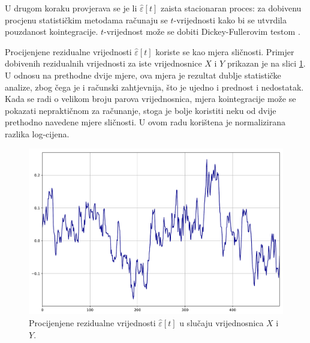 \documentclass[lmodern, utf8, diplomski, numeric]{fer}
\newcommand{\q}{\left}
\newcommand{\w}{\right}
\begin{document}
  U drugom koraku provjerava se je li $\hat{\varepsilon}\q[t\w]$ zaista stacionaran proces: za dobivenu procjenu statističkim metodama računaju se $t$-vrijednosti kako bi se utvrdila pouzdanost kointegracije.
  $t$-vrijednost može se dobiti Dickey-Fullerovim testom \citep{dickey-fuller}.
  
  Procijenjene rezidualne vrijednosti $\hat{\varepsilon}\q[t\w]$ koriste se kao mjera sličnosti.
  Primjer dobivenih rezidualnih vrijednosti za iste vrijednosnice $X$ i $Y$ prikazan je na slici \ref{fig:residual}.
  U odnosu na prethodne dvije mjere, ova mjera je rezultat dublje statističke analize, zbog čega je i računski zahtjevnija, što je ujedno i prednost i nedostatak.
  Kada se radi o velikom broju parova vrijednosnica, mjera kointegracije može se pokazati nepraktičnom za računanje, stoga je bolje koristiti neku od dvije prethodno navedene mjere sličnosti.
  U ovom radu korištena je normalizirana razlika log-cijena.
  
  \begin{figure}[H]
    \centering
    \includegraphics[width=1.0\linewidth]{graphics/residual.pdf}
    \caption{
      Procijenjene rezidualne vrijednosti $\hat{\varepsilon}\q[t\w]$ u slučaju vrijednosnica $X$ i $Y$.}
    \label{fig:residual}
  \end{figure}
  
\end{document}
